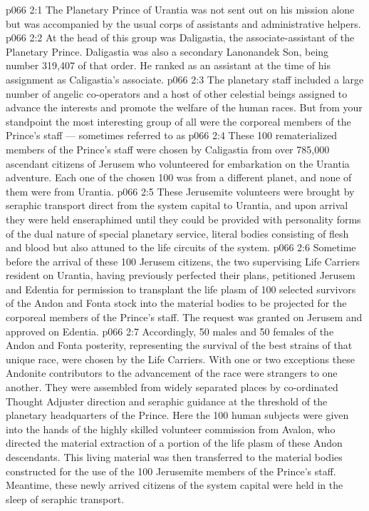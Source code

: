 \vs p066 2:1 The Planetary Prince of Urantia was not sent out on his mission alone but was accompanied by the usual corps of assistants and administrative helpers.
\vs p066 2:2 At the head of this group was Daligastia, the associate\hyp{}assistant of the Planetary Prince. Daligastia was also a secondary Lanonandek Son, being number 319,407 of that order. He ranked as an assistant at the time of his assignment as Caligastia’s associate.
\vs p066 2:3 The planetary staff included a large number of angelic co\hyp{}operators and a host of other celestial beings assigned to advance the interests and promote the welfare of the human races. But from your standpoint the most interesting group of all were the corporeal members of the Prince’s staff --- sometimes referred to as 
\vs p066 2:4 \pc These 100 rematerialized members of the Prince’s staff were chosen by Caligastia from over 785,000 ascendant citizens of Jerusem who volunteered for embarkation on the Urantia adventure. Each one of the chosen 100 was from a different planet, and none of them were from Urantia.
\vs p066 2:5 These Jerusemite volunteers were brought by seraphic transport direct from the system capital to Urantia, and upon arrival they were held enseraphimed until they could be provided with personality forms of the dual nature of special planetary service, literal bodies consisting of flesh and blood but also attuned to the life circuits of the system.
\vs p066 2:6 \pc Sometime before the arrival of these 100 Jerusem citizens, the two supervising Life Carriers resident on Urantia, having previously perfected their plans, petitioned Jerusem and Edentia for permission to transplant the life plasm of 100 selected survivors of the Andon and Fonta stock into the material bodies to be projected for the corporeal members of the Prince’s staff. The request was granted on Jerusem and approved on Edentia.
\vs p066 2:7 Accordingly, 50 males and 50 females of the Andon and Fonta posterity, representing the survival of the best strains of that unique race, were chosen by the Life Carriers. With one or two exceptions these Andonite contributors to the advancement of the race were strangers to one another. They were assembled from widely separated places by co\hyp{}ordinated Thought Adjuster direction and seraphic guidance at the threshold of the planetary headquarters of the Prince. Here the 100 human subjects were given into the hands of the highly skilled volunteer commission from Avalon, who directed the material extraction of a portion of the life plasm of these Andon descendants. This living material was then transferred to the material bodies constructed for the use of the 100 Jerusemite members of the Prince’s staff. Meantime, these newly arrived citizens of the system capital were held in the sleep of seraphic transport.
